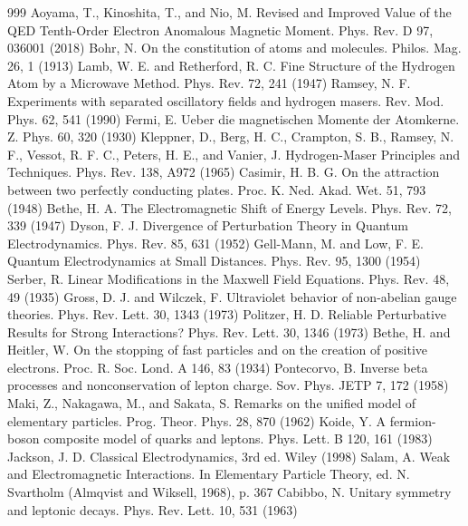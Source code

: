 \begin{thebibliography}{999}
 Aoyama, T., Kinoshita, T., and Nio, M. Revised and Improved Value of the QED Tenth-Order Electron Anomalous Magnetic Moment. Phys. Rev. D 97, 036001 (2018)
 Bohr, N. On the constitution of atoms and molecules. Philos. Mag. 26, 1 (1913)
 Lamb, W. E. and Retherford, R. C. Fine Structure of the Hydrogen Atom by a Microwave Method. Phys. Rev. 72, 241 (1947)
 Ramsey, N. F. Experiments with separated oscillatory fields and hydrogen masers. Rev. Mod. Phys. 62, 541 (1990)
 Fermi, E. Ueber die magnetischen Momente der Atomkerne. Z. Phys. 60, 320 (1930)
 Kleppner, D., Berg, H. C., Crampton, S. B., Ramsey, N. F., Vessot, R. F. C., Peters, H. E., and Vanier, J. Hydrogen-Maser Principles and Techniques. Phys. Rev. 138, A972 (1965)
 Casimir, H. B. G. On the attraction between two perfectly conducting plates. Proc. K. Ned. Akad. Wet. 51, 793 (1948)
 Bethe, H. A. The Electromagnetic Shift of Energy Levels. Phys. Rev. 72, 339 (1947)
 Dyson, F. J. Divergence of Perturbation Theory in Quantum Electrodynamics. Phys. Rev. 85, 631 (1952)
 Gell-Mann, M. and Low, F. E. Quantum Electrodynamics at Small Distances. Phys. Rev. 95, 1300 (1954)
 Serber, R. Linear Modifications in the Maxwell Field Equations. Phys. Rev. 48, 49 (1935)
 Gross, D. J. and Wilczek, F. Ultraviolet behavior of non-abelian gauge theories. Phys. Rev. Lett. 30, 1343 (1973)
 Politzer, H. D. Reliable Perturbative Results for Strong Interactions? Phys. Rev. Lett. 30, 1346 (1973)
 Bethe, H. and Heitler, W. On the stopping of fast particles and on the creation of positive electrons. Proc. R. Soc. Lond. A 146, 83 (1934)
 Pontecorvo, B. Inverse beta processes and nonconservation of lepton charge. Sov. Phys. JETP 7, 172 (1958)
 Maki, Z., Nakagawa, M., and Sakata, S. Remarks on the unified model of elementary particles. Prog. Theor. Phys. 28, 870 (1962)
 Koide, Y. A fermion-boson composite model of quarks and leptons. Phys. Lett. B 120, 161 (1983)
 Jackson, J. D. Classical Electrodynamics, 3rd ed. Wiley (1998)
 Salam, A. Weak and Electromagnetic Interactions. In Elementary Particle Theory, ed. N. Svartholm (Almqvist and Wiksell, 1968), p. 367
 Cabibbo, N. Unitary symmetry and leptonic decays. Phys. Rev. Lett. 10, 531 (1963)

\end{thebibliography}
